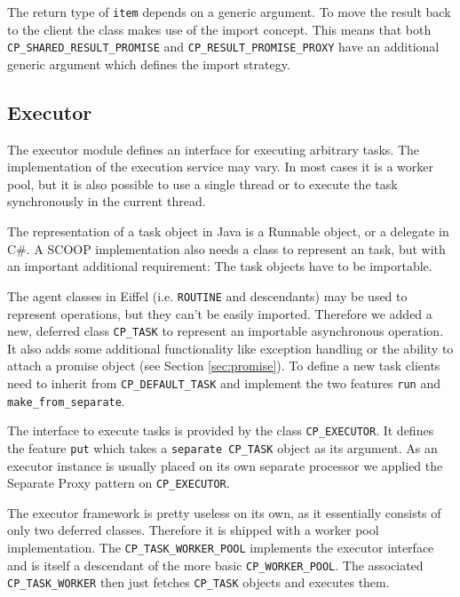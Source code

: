 The return type of \lstinline!item! depends on a generic argument.
To move the result back to the client the class makes use of the import concept.
This means that both \lstinline!CP_SHARED_RESULT_PROMISE! and \lstinline!CP_RESULT_PROMISE_PROXY! have an additional generic argument which defines the import strategy.

\subsection{Executor}
\label{sec:executor}

The executor module defines an interface for executing arbitrary tasks.
The implementation of the execution service may vary.
In most cases it is a worker pool, but it is also possible to use a single thread or to execute the task synchronously in the current thread.

The representation of a task object in Java is a Runnable object, or a delegate in C\#.
A SCOOP implementation also needs a class to represent an task, but with an important additional requirement: 
The task objects have to be importable.

The agent classes in Eiffel (i.e. \lstinline!ROUTINE! and descendants) may be used to represent operations, but they can't be easily imported.
Therefore we added a new, deferred class \lstinline!CP_TASK! to represent an importable asynchronous operation.
It also adds some additional functionality like exception handling or the ability to attach a promise object (see Section \ref{sec:promise}).
To define a new task clients need to inherit from \lstinline!CP_DEFAULT_TASK! and implement the two features \lstinline!run! and \lstinline!make_from_separate!.

The interface to execute tasks is provided by the class \lstinline!CP_EXECUTOR!.
It defines the feature \lstinline!put! which takes a \lstinline!separate CP_TASK! object as its argument.
As an executor instance is usually placed on its own separate processor we applied the Separate Proxy pattern  on \lstinline!CP_EXECUTOR!.

The executor framework is pretty useless on its own, as it essentially consists of only two deferred classes.
Therefore it is shipped with a worker pool implementation.
The \lstinline!CP_TASK_WORKER_POOL! implements the executor interface and is itself a descendant of the more basic \lstinline!CP_WORKER_POOL!.
The associated \lstinline!CP_TASK_WORKER! then just fetches \lstinline!CP_TASK! objects and executes them.

